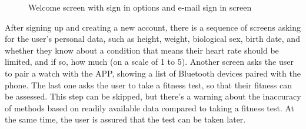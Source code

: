 \begin{figure}[h!]
    \centering
    \hfill
    \caption{Welcome screen with sign in options and e-mail sign in screen}
    \label{fig:sign-in-email}
\end{figure}

After signing up and creating a new account, there is a sequence of screens asking for the user's personal data, such as height, weight, biological sex, birth date, and whether they know about a condition that means their heart rate should be limited, and if so, how much (on a scale of 1 to 5).
Another screen asks the user to pair a watch with the APP, showing a list of Bluetooth devices paired with the phone.
The last one asks the user to take a fitness test, so that their fitness can be assessed.
This step can be skipped, but there's a warning about the inaccuracy of methods based on readily available data compared to taking a fitness test.
At the same time, the user is assured that the test can be taken later.

